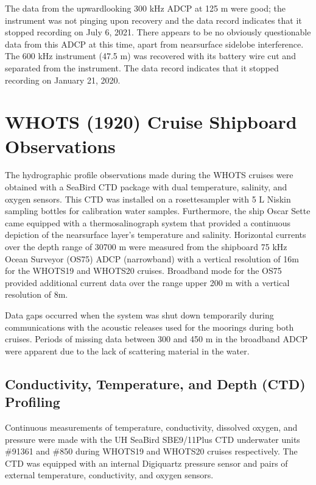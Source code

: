 \documentclass[a4paper,10pt,english,openany,oneside]{sphinxmanual}
\begin{document}
\sphinxAtStartPar
The data from the upward\sphinxhyphen{}looking 300 kHz ADCP at 125 m were good; the
instrument was not pinging upon recovery and the data record indicates that it
stopped recording on July 6, 2021. There appears to be no obviously
questionable data from this ADCP at this time, apart from near\sphinxhyphen{}surface
side\sphinxhyphen{}lobe interference. The 600 kHz instrument (47.5 m) was recovered with its battery
wire cut and separated from the instrument. The data record indicates that it
stopped recording on January 21, 2020.


\chapter{WHOTS (19\sphinxhyphen{}20) Cruise Shipboard Observations}
\label{\detokenize{4_section:whots-19-20-cruise-shipboard-observations}}\label{\detokenize{4_section::doc}}
\sphinxAtStartPar
The hydrographic profile observations made during the WHOTS cruises were
obtained with a Sea\sphinxhyphen{}Bird CTD package with dual temperature, salinity, and
oxygen sensors. This CTD was installed on a rosette\sphinxhyphen{}sampler with 5 L Niskin
sampling bottles for calibration water samples. Furthermore, the ship Oscar
Sette came equipped with a thermosalinograph system that provided a continuous
depiction of the near\sphinxhyphen{}surface layer’s temperature and salinity. Horizontal
currents over the depth range of 30\sphinxhyphen{}700 m were measured from the shipboard 75
kHz Ocean Surveyor (OS75) ADCP (narrowband) with a vertical resolution of 16m
for the WHOTS\sphinxhyphen{}19 and WHOTS\sphinxhyphen{}20 cruises. Broadband mode for the OS75 provided
additional current data over the range upper 200 m with a vertical resolution
of 8m.

\sphinxAtStartPar
Data gaps occurred when the system was shut down temporarily during
communications with the acoustic releases used for the moorings during both
cruises. Periods of missing data between 300 and 450 m in the broadband ADCP
were apparent due to the lack of scattering material in the water.


\section{Conductivity, Temperature, and Depth (CTD) Profiling}
\label{\detokenize{4_section:conductivity-temperature-and-depth-ctd-profiling}}
\sphinxAtStartPar
Continuous measurements of temperature, conductivity, dissolved oxygen, and
pressure were made with the UH Sea\sphinxhyphen{}Bird SBE\sphinxhyphen{}9/11Plus CTD underwater units
\#91361 and \#850 during WHOTS\sphinxhyphen{}19 and WHOTS\sphinxhyphen{}20 cruises respectively. The CTD was
equipped with an internal Digiquartz pressure sensor and pairs of external
temperature, conductivity, and oxygen sensors.
\end{document}
